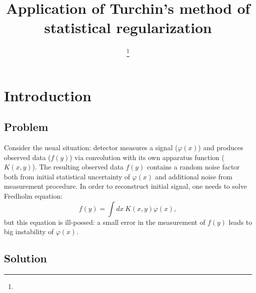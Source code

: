\documentclass{webofc}
\begin{document}
\title{Application of Turchin's method of statistical regularization}
\author{ \fnsep\thanks{} \and
      
    }
%
%
\maketitle

\section{Introduction}

\subsection{Problem}

Consider the usual situation: detector measures a signal ($\varphi(x)$) and produces observed data ($f(y)$) via convolution with its own apparatus function ($K(x,y)$). The resulting observed data $f(y)$ contains a random noise factor both from initial statistical uncertainty of $\varphi(x)$ and additional noise from measurement procedure. In order to reconstruct initial signal, one needs to solve Fredholm equation:
\begin{equation}
\label{eq-01}
    f(y) = \int dx~ K(x,y)\varphi(x),
\end{equation}
but this equation is ill-possed: a small error in the measurement of $f(y)$ leads to big instability of $\varphi(x)$. 

\subsection{Solution}
\end{document}
